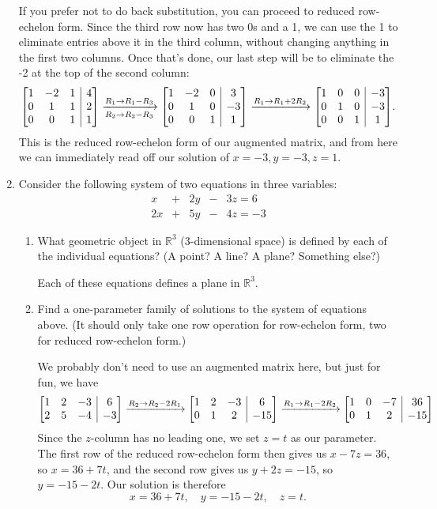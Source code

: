 \documentclass[12pt]{article}
\makeatletter
\newenvironment{amatrix}[1]{%
  \left[\begin{array}{@{}*{#1}{c}|c@{}}
}{%
  \end{array}\right]
}
\newcommand{\R}{\mathbb{R}}
\newcommand{\bam}{\begin{amatrix}}
\newcommand{\eam}{\end{amatrix}}
\makeatother
\begin{document}
\begin{enumerate}
If you prefer not to do back substitution, you can proceed to reduced row-echelon form. Since the third row now has two 0s and a 1, we can use the 1 to eliminate entries above it in the third column, without changing anything in the first two columns. Once that's done, our last step will be to eliminate the -2 at the top of the second column:
\[
 \bam{3}1&-2&1&4\\0&1&1&2\\0&0&1&1\eam  \xrightarrow[R_2\to R_2-R_3]{R_1\to R_1-R_3} \bam{3}1&-2&0&3\\0&1&0&-3\\0&0&1&1\eam \xrightarrow[]{R_1\to R_1+2R_2} \bam{3} 1&0&0&-3\\0&1&0&-3\\0&0&1&1\eam.
\]
This is the reduced row-echelon form of our augmented matrix, and from here we can immediately read off our solution of $x=-3, y=-3, z=1$.
\newpage

 \item Consider the following system of two equations in three variables:
\[
 \begin{array}{ccccccc}
  x&+&2y&-&3z=6\\
 2x&+&5y&-&4z=-3
 \end{array}
\]
\begin{enumerate}
 \item What geometric object in $\R^3$ (3-dimensional space) is defined by each of the individual equations? (A point? A line? A plane? Something else?)

\medskip

Each of these equations defines a plane in $\R^3$.

\medskip

 \item Find a one-parameter family of solutions to the system of equations above. (It should only take one row operation for row-echelon form, two for reduced row-echelon form.)

\bigskip

We probably don't need to use an augmented matrix here, but just for fun, we have
\[
 \bam{3} 1&2&-3&6\\2&5&-4&-3\eam \xrightarrow[]{R_2\to R_2-2R_1} \bam{3} 1&2&-3&6\\0&1&2&-15\eam \xrightarrow[]{R_1\to R_1-2R_2} \bam{3}1&0&-7&36\\0&1&2&-15\eam
\]
Since the $z$-column has no leading one, we set $z=t$ as our parameter. The first row of the reduced row-echelon form then gives us $x-7z=36$, so $x=36+7t$, and the second row gives us $y+2z=-15$, so $y=-15-2t$. Our solution is therefore
\[
 x=36+7t,\quad y=-15-2t,\quad z=t.
\]




\end{enumerate}
\end{enumerate}
\end{document}
